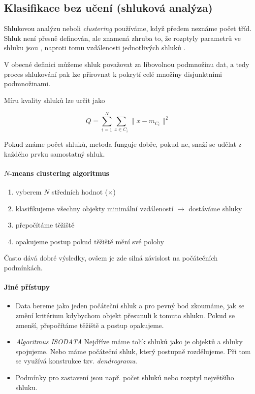 \subsection{Klasifikace bez učení (shluková analýza)}

Shlukovou analýzu neboli \emph{clustering} používáme, když předem neznáme počet tříd. Shluk není přesně definován,
ale znamená zhruba to, že rozptyly parametrů ve shluku jsou , naproti tomu vzdálenosti jednotlivých shluků
. 

V obecné definici můžeme shluk považovat za libovolnou podmnožinu dat, a tedy proces shlukování pak lze přirovnat k pokrytí
celé množiny disjunktními podmnožinami.

Míru kvality shluků lze určit jako

\begin{equation}
Q=\sum\limits_{i=1}^N\sum\limits_{x\in C_i}\|x-m_{C_i}\|^2
\end{equation}

Pokud známe počet shluků, metoda funguje dobře, pokud ne, snaží se udělat z každého prvku samostatný shluk.

\paragraph{$N$-means clustering algoritmus}
\begin{enumerate}
	\item vyberem $N$ středních hodnot ($\times$)
	\item klasifikujeme všechny objekty minimální vzdáleností $\rightarrow$ dostáváme shluky
	\item přepočítáme těžiště
	\item opakujeme postup pokud těžiště mění své polohy 
\end{enumerate}

Často dává dobré výsledky, ovšem je zde silná závislost na počátečních podmínkách.

\paragraph{Jiné přístupy}

\begin{itemize}
	\item Data bereme jako jeden počáteční shluk a pro pevný bod zkoumáme, jak se změní kritérium kdybychom
	objekt přesunuli k tomuto shluku. Pokud se zmenší, přepočítáme těžiště a postup opakujeme.
	\item \emph{Algoritmus ISODATA} Nejdříve máme tolik shluků jako je objektů a shluky spojujeme. Nebo máme počáteční shluk,
	který postupně rozdělujeme. Při tom se využívá konstrukce tzv. \emph{dendrogramu}.
	\item Podmínky pro zastavení jsou např. počet shluků nebo rozptyl největšího shluku.
\end{itemize}

